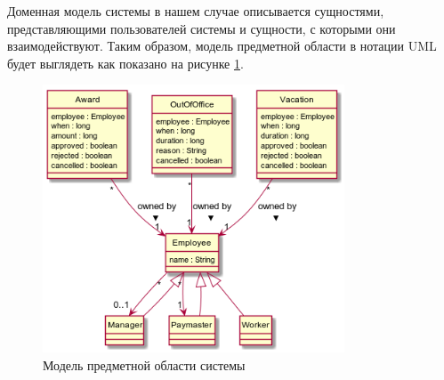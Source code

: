 Доменная модель системы в нашем случае описывается сущностями, представляющими пользователей системы и сущности, с которыми они 
взаимодействуют. Таким образом, модель предметной области в нотации UML будет выглядеть как показано на рисунке \ref{fig:01-domain}.

\begin{figure}[H]
    \centering
    \includegraphics[width=0.8\textwidth]{resources/01_analysis/02_domain.png}
    \caption{Модель предметной области системы}
    \label{fig:01-domain}
\end{figure}

